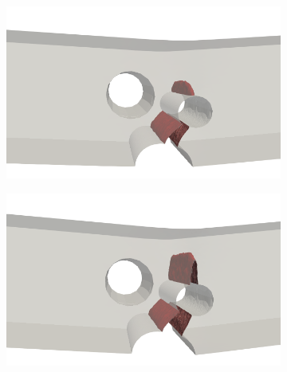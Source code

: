 \begin{frame}
\begin{columns}[T]
\begin{column}{0.6\textwidth}
\begin{figure}
\begin{minipage}{0.6\textwidth}
\begin{subfigure}{0.45\textwidth}
          \end{subfigure}
          
          \begin{subfigure}{0.45\textwidth}
            \centering
            \includegraphics[width=\linewidth]{Chapter345/figures/III}
          \end{subfigure}
          \begin{subfigure}{0.45\textwidth}
            \centering
            \includegraphics[width=\linewidth]{Chapter345/figures/IV}
          \end{subfigure}
        \end{minipage}
        

\end{figure}
\end{column}
\end{columns}
\end{frame}
